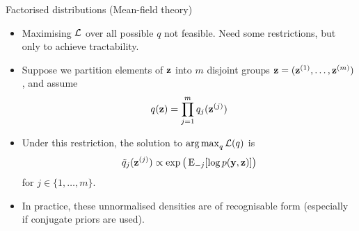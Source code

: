\begin{frame}{Factorised distributions (Mean-field theory)}
  \vspace{-20pt}
  \begin{itemize}
    \item<1-> Maximising ${\mathcal L}$ over all possible $q$ not feasible. Need some restrictions, but only to achieve tractability.
    \item<1-> Suppose we partition elements of ${\mathbf z}$ into $m$ disjoint groups ${\mathbf z} = ({\mathbf z}^{(1)}, \dots, {\mathbf z}^{(m)})$, and assume
    \[
      q({\mathbf z}) = \prod_{j=1}^m q_j({\mathbf z}^{(j)})
    \]
    \item<2-> Under this restriction, the solution to $\operatorname*{arg\,max}_q {\mathcal L}(q)$ is
    \begin{align}\label{eq:meanfieldsoln}
      \tilde q_j({\mathbf z}^{(j)}) \propto \exp\big(\operatorname{E}_{-j}[\log p({\mathbf y},{\mathbf z})]\big)
    \end{align}
    for $j \in \{1,\dots,m\}$.
    \item<3-> In practice, these unnormalised densities are of recognisable form (especially if conjugate priors are used).
    \vspace{4pt}
  \end{itemize}
\end{frame}

